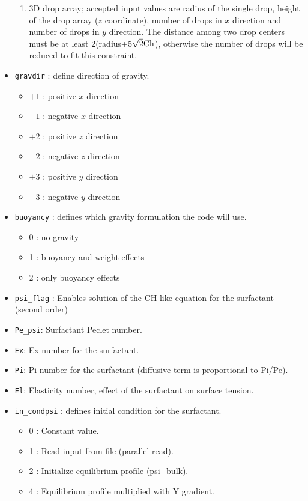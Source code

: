 \begin{itemize}
\begin{enumerate}
\item 3D drop array; accepted input values are radius of the single drop, height of the drop array ($z$ coordinate), number of drops in $x$ direction and number of drops in $y$ direction. The distance among two drop centers must be at least 2(radius+5$\sqrt{2}\textnormal{Ch}$), otherwise the number of drops will be reduced to fit this constraint.
\end{enumerate}
\item \texttt{gravdir} : define direction of gravity.
\begin{itemize}[label={$\circ$}]
\item $+1$ : positive $x$ direction
\item $-1$ : negative $x$ direction
\item $+2$ : positive $z$ direction
\item $-2$ : negative $z$ direction
\item $+3$ : positive $y$ direction
\item $-3$ : negative $y$ direction
\end{itemize}
\item \texttt{buoyancy} : defines which gravity formulation the code will use.
\begin{itemize}[label={$\circ$}]
\item 0 : no gravity
\item 1 : buoyancy and weight effects
\item 2 : only buoyancy effects
\end{itemize}
\item \texttt{psi\_flag} : Enables solution of the CH-like equation for the surfactant (second order)
\item \texttt{Pe\_psi}: Surfactant Peclet number.
\item \texttt{Ex}: Ex number for the surfactant.
\item \texttt{Pi}: Pi number for the surfactant (diffusive term is proportional to Pi/Pe).
\item \texttt{El}: Elasticity number, effect of the surfactant on surface tension.
\item \texttt{in\_condpsi} : defines initial condition for the surfactant.
\begin{itemize}[label={$\circ$}]
\item 0 : Constant value.
\item 1 : Read input from file (parallel read).
\item 2 : Initialize equilibrium profile (psi\_bulk).
\item 4 : Equilibrium profile multiplied with Y gradient.

\end{itemize}
\end{itemize}

